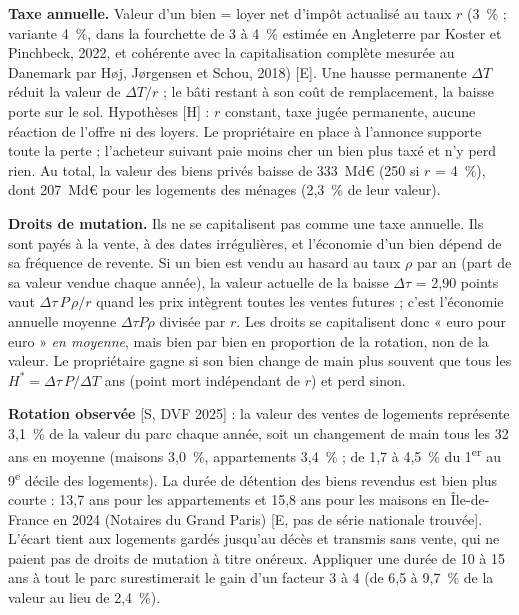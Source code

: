 \textbf{Taxe annuelle.} Valeur d'un bien = loyer net d'impôt actualisé au taux $r$ (3~\% ; variante 4~\%, dans la
fourchette de 3 à 4~\% estimée en Angleterre par Koster et Pinchbeck, 2022, et cohérente avec la capitalisation complète
mesurée au Danemark par Høj, Jørgensen et Schou, 2018) [E]. Une hausse permanente $\Delta T$ réduit la valeur de
$\Delta T/r$ ; le bâti restant à son coût de remplacement, la baisse porte sur le sol. Hypothèses [H] : $r$ constant,
taxe jugée permanente, aucune réaction de l'offre ni des loyers. Le propriétaire en place à l'annonce supporte toute la
perte ; l'acheteur suivant paie moins cher un bien plus taxé et n'y perd rien. Au total, la valeur des biens privés
baisse de 333~Md€ (250 si $r$ = 4~\%),
dont 207~Md€ pour les logements des ménages (2,3~\% de leur valeur).

\textbf{Droits de mutation.} Ils ne se capitalisent pas comme une taxe annuelle. Ils sont payés à la vente, à des
dates irrégulières, et l'économie d'un bien dépend de sa fréquence de revente. Si un bien est vendu au hasard au taux
$\rho$ par an (part de sa valeur vendue chaque année), la valeur actuelle de la baisse $\Delta\tau$ = 2,90 points vaut
$\Delta\tau\,P\,\rho/r$ quand les prix intègrent toutes les ventes futures ; c'est l'économie annuelle moyenne $\Delta\tau
P\rho$ divisée par $r$. Les droits se capitalisent donc « euro pour euro » \emph{en moyenne}, mais bien par bien en
proportion de la rotation, non de la valeur. Le propriétaire gagne si son bien change de main plus souvent que tous les
$H^* = \Delta\tau\,P/\Delta T$ ans (point mort indépendant de $r$) et perd sinon.

\textbf{Rotation observée} [S, DVF 2025] : la valeur des ventes de logements représente 3,1~\% de
la valeur du parc chaque année, soit un changement de main tous les 32 ans en moyenne
(maisons 3,0~\%, appartements 3,4~\% ; de 1,7 à
4,5~\% du 1\textsuperscript{er} au 9\textsuperscript{e} décile des logements). La durée de détention
des biens revendus est bien plus courte : 13,7 ans pour les appartements et 15,8 ans pour les maisons en Île-de-France en
2024 (Notaires du Grand Paris) [E, pas de série nationale trouvée]. L'écart tient aux logements gardés jusqu'au décès et
transmis sans vente, qui ne paient pas de droits de mutation à titre onéreux. Appliquer une durée de 10 à 15 ans à tout
le parc surestimerait le gain d'un facteur 3 à 4 (de 6,5 à
9,7~\% de la valeur au lieu de 2,4~\%).

